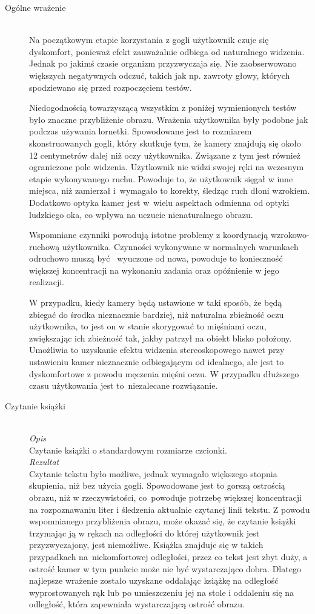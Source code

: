\documentclass[a4paper,11pt,twoside]{report}
\theoremstyle{definition}
\begin{document}
\begin{description}
\item[Ogólne wrażenie] \hfill \\
Na początkowym etapie korzystania z gogli użytkownik czuje się dyskomfort, ponieważ efekt zauważalnie odbiega od naturalnego widzenia. Jednak po jakimś czasie organizm przyzwyczaja się. Nie zaobserwowano większych negatywnych odczuć, takich jak np. zawroty głowy, których spodziewano się przed rozpoczęciem testów.

Niedogodnością towarzyszącą wszystkim z poniżej wymienionych testów było znaczne przybliżenie obrazu. Wrażenia użytkownika były podobne jak podczas używania lornetki. Spowodowane jest to rozmiarem skonstruowanych gogli, który skutkuje tym, że kamery znajdują się około 12 centymetrów dalej niż oczy użytkownika. Związane z tym jest również ograniczone pole widzenia. Użytkownik nie widzi swojej ręki na wczesnym etapie wykonywanego ruchu. Powoduje to, że użytkownik sięgał w inne miejsca, niż zamierzał i~wymagało to korekty, śledząc ruch dłoni wzrokiem. Dodatkowo optyka kamer jest w~wielu aspektach odmienna od optyki ludzkiego oka, co wpływa na uczucie nienaturalnego obrazu.

Wspomniane czynniki powodują istotne problemy z koordynacją wzrokowo-ruchową użytkownika. Czynności wykonywane w normalnych warunkach odruchowo muszą być ~wyuczone od nowa,  powoduje to konieczność większej koncentracji na wykonaniu zadania oraz opóźnienie w jego realizacji.

W przypadku, kiedy kamery będą ustawione w taki sposób, że będą zbiegać do środka nieznacznie bardziej, niż naturalna zbieżność oczu użytkownika, to jest on w stanie skorygować to mięśniami oczu, zwiększając ich zbieżność tak, jakby patrzył na obiekt blisko położony. Umożliwia to uzyskanie efektu widzenia stereoskopowego nawet przy ustawieniu kamer nieznacznie odbiegającym od idealnego, ale jest to dyskomfortowe z powodu męczenia mięśni oczu. W przypadku dłuższego czasu użytkowania jest to~niezalecane rozwiązanie.

\item[Czytanie książki] \hfill \\
\textit{Opis} \\
Czytanie książki o standardowym rozmiarze czcionki. \\

\textit{Rezultat} \\
Czytanie tekstu było możliwe, jednak wymagało większego stopnia skupienia, niż bez użycia gogli. Spowodowane jest to gorszą ostrością obrazu, niż w rzeczywistości, co~powoduje potrzebę większej koncentracji na rozpoznawaniu liter i śledzenia aktualnie czytanej linii tekstu. Z powodu wspomnianego przybliżenia obrazu, może okazać się, że czytanie książki trzymając ją w rękach na odległości do której użytkownik jest przyzwyczajony, jest niemożliwe. Książka znajduje się w takich przypadkach na~niekomfortowej odległości, przez co tekst jest zbyt duży, a ostrość kamer w tym punkcie może nie być wystarczająco dobra. Dlatego najlepsze wrażenie zostało uzyskane oddalając książkę na odległość wyprostowanych rąk lub po umieszczeniu jej na stole i oddaleniu się na odległość, która zapewniała wystarczającą ostrość obrazu.    


\end{description}
\end{document}
